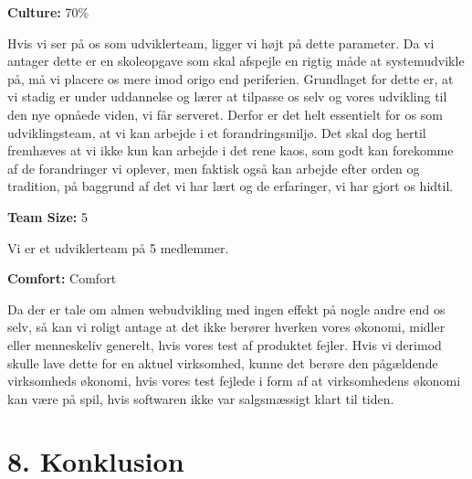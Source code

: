 \documentclass[11pt]{report}
\begin{document}
\noindent\textbf{Culture:} 70\%

Hvis vi ser på os som udviklerteam, ligger vi højt på dette parameter. Da vi antager dette er en skoleopgave som skal afspejle en rigtig måde at systemudvikle på, må vi placere os mere imod origo end periferien. Grundlaget for dette er, at vi stadig er under uddannelse og lærer at tilpasse os selv og vores udvikling til den nye opnåede viden, vi får serveret. Derfor er det helt essentielt for os som udviklingsteam, at vi kan arbejde i et forandringsmiljø. Det skal dog hertil fremhæves at vi ikke kun kan arbejde i det rene kaos, som godt kan forekomme af de forandringer vi oplever, men faktisk også kan arbejde efter orden og tradition, på baggrund af det vi har lært og de erfaringer, vi har gjort os  hidtil.

\noindent\textbf{Team Size:} 5

Vi er et udviklerteam på 5 medlemmer.

\noindent\textbf{Comfort:} Comfort

Da der er tale om almen webudvikling med ingen effekt på nogle andre end os selv, så kan vi roligt antage at det ikke berører hverken vores økonomi, midler eller menneskeliv generelt, hvis vores test af produktet fejler. Hvis vi derimod skulle lave dette for en aktuel virksomhed, kunne det berøre den pågældende virksomheds økonomi, hvis vores test fejlede i form af at virksomhedens økonomi kan være på spil, hvis softwaren ikke var salgsmæssigt klart til tiden.

\chapter*{8. Konklusion}
\end{document}
